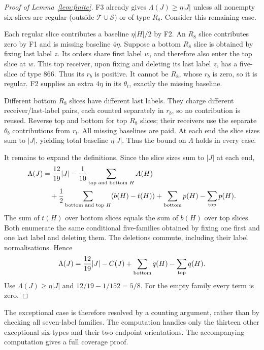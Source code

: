 \documentclass[11pt,letterpaper]{article}
\theoremstyle{definition}
\begin{document}
\begin{proof}[Proof of Lemma~\ref{lem:finite}]
F3 already gives \(\Lambda(J)\geq\eta|J|\) unless all nonempty
six-slices are regular (outside \(\mathcal T\cup\mathcal S\)) or
of type \(R_8\). Consider this remaining case.

Each regular slice contributes a baseline \(\eta|H|/2\) by F2.
An \(R_8\) slice contributes zero by F1 and is missing baseline
\(4\eta\). Suppose a bottom \(R_8\) slice is obtained by fixing
last label \(z\). Its orders share first label \(w\), and therefore
also enter the top slice at \(w\). This top receiver, upon fixing
and deleting its last label \(z\), has a five-slice of type 866.
Thus its \(r_b\) is positive. It cannot be \(R_8\), whose \(r_b\)
is zero, so it is regular. F2 supplies an extra \(4\eta\) in its
\(\theta_t\), exactly the missing baseline.

Different bottom \(R_8\) slices have different last labels. They
charge different receiver/last-label pairs, each counted separately
in \(r_b\), so no contribution is reused. Reverse top and bottom
for top \(R_8\) slices; their receivers use the separate
\(\theta_b\) contributions from \(r_t\). All missing baselines
are paid. At each end the slice sizes sum to \(|J|\), yielding
total baseline \(\eta|J|\). Thus the bound on \(\Lambda\) holds
in every case.

It remains to expand the definitions. Since the slice sizes sum to
\(|J|\) at each end,
\begin{align*}
 \Lambda(J)
 &=\frac{12}{19}|J|-\frac1{10}
       \sum_{\text{top and bottom }H}A(H)\\
 &\quad+\frac12\sum_{\text{bottom and top }H}(b(H)-t(H))
       +\sum_{\rm bottom}p(H)-\sum_{\rm top}p(H).
\end{align*}
The sum of \(t(H)\) over bottom slices equals the sum of \(b(H)\)
over top slices. Both enumerate the same conditional five-families
obtained by fixing one first and one last label and deleting them.
The deletions commute, including their label normalisations. Hence
\[
 \Lambda(J)=\frac{12}{19}|J|-C(J)
       +\sum_{\rm bottom}q(H)-\sum_{\rm top}q(H).
\]
Use \(\Lambda(J)\geq\eta|J|\) and
\(12/19-1/152=5/8\). For the empty family every term is zero.
\end{proof}

The exceptional case is therefore resolved by a counting argument,
rather than by checking all seven-label families. The computation
handles only the thirteen other exceptional six-types and their two
endpoint orientations. The accompanying computation gives a full coverage proof.
\end{document}
